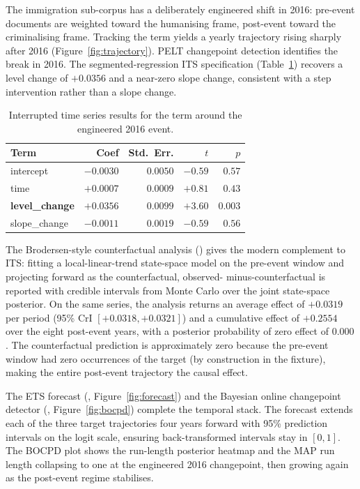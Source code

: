 \documentclass[codesnippet]{jss}
\newcommand{\fct}[1]{\code{#1()}}
\begin{document}
The immigration sub-corpus has a deliberately engineered shift
in 2016: pre-event documents are weighted toward the humanising
frame, post-event toward the criminalising frame. Tracking the
 term yields a yearly trajectory rising sharply
after 2016 (Figure~\ref{fig:trajectory}). PELT changepoint
detection identifies the break in 2016. The segmented-regression
ITS specification (Table~\ref{tab:its}) recovers a level change
of $+0.0356$ and a near-zero slope change, consistent with a
step intervention rather than a slope change.

\begin{table}[t]
  \centering
  \begin{tabular}{lrrrr}
    \toprule
    Term & Coef & Std.\ Err. & $t$ & $p$ \\
    \midrule
    intercept & $-0.0030$ & $0.0050$ & $-0.59$ & $0.57$ \\
    time & $+0.0007$ & $0.0009$ & $+0.81$ & $0.43$ \\
    \textbf{level\_change} & $\mathbf{+0.0356}$ & $0.0099$ & $+3.60$ & $0.003$ \\
    slope\_change & $-0.0011$ & $0.0019$ & $-0.59$ & $0.56$ \\
    \bottomrule
  \end{tabular}
  \caption{Interrupted time series results for the
     term around the engineered 2016 event.}\label{tab:its}
\end{table}

The Brodersen-style counterfactual analysis
(\fct{causal\_impact}) gives the modern complement to ITS:
fitting a local-linear-trend state-space model on the pre-event
window and projecting forward as the counterfactual, observed-
minus-counterfactual is reported with credible intervals from
Monte Carlo over the joint state-space posterior. On the same
 series, the analysis returns an average effect
of $+0.0319$ per period (95\% CrI $[+0.0318, +0.0321]$) and a
cumulative effect of $+0.2554$ over the eight post-event years,
with a posterior probability of zero effect of $0.000$. The
counterfactual prediction is approximately zero because the
pre-event window had zero occurrences of the target (by
construction in the fixture), making the entire post-event
trajectory the causal effect.

The ETS forecast (\fct{forecast}, Figure~\ref{fig:forecast}) and
the Bayesian online changepoint detector
(\fct{changepoints\_online}, Figure~\ref{fig:bocpd}) complete
the temporal stack. The forecast extends each of the three
target trajectories four years forward with 95\% prediction
intervals on the logit scale, ensuring back-transformed
intervals stay in $[0, 1]$. The BOCPD plot shows the run-length
posterior heatmap and the MAP run length collapsing to one at
the engineered 2016 changepoint, then growing again as the
post-event regime stabilises.
\end{document}
